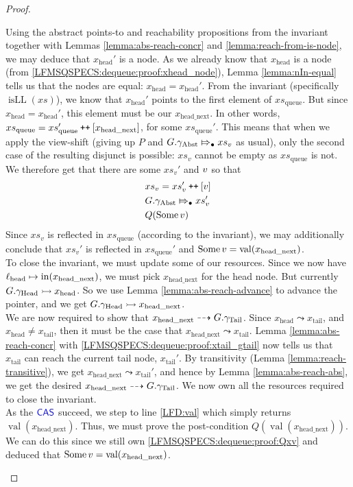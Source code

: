 \documentclass[a4paper, 10pt]{report}
\theoremstyle{definition}
\newcommand{\xsc}{xs}
\newcommand{\xsqueue}{xs_{\mathrm{queue}}}
\newcommand{\isLL}{\operatorname{isLL}}
\newcommand{\locN}[1]{\loc_{\mathrm{#1}}}
\newcommand{\lochead}{\locN{head}}
\newcommand{\nIn}[1]{\operatorname{in}(#1)}
\newcommand{\nVal}[1]{\operatorname{val}(#1)}
\newcommand{\node}{x}
\newcommand{\nodeN}[1]{\node_{\mathrm{#1}}}
\newcommand{\nodehead}{\nodeN{head}}
\newcommand{\nodetail}{\nodeN{tail}}
\newcommand{\nodeheadnext}{\nodeN{head\_next}}
\newcommand{\absvalue}{\val}
\newcommand{\absvalueList}{xs_v}
\newcommand{\Qg}{G}
\newcommand{\gabst}{\gname_{\mathrm{Abst}}}
\newcommand{\ghead}{\gname_{\mathrm{Head}}}
\newcommand{\gtail}{\gname_{\mathrm{Tail}}}
\newcommand\catenate{\mathbin{\text{\ttfamily\upshape ++}}}
\newcommand{\abstractstateauth}[2]{#1 \Mapsto_{\bullet} #2}
\newcommand{\reach}[2]{#1 \leadsto #2}
\newcommand{\ar}[2]{#1 \dashrightarrow #2}
\newcommand{\ap}[2]{#1 \rightarrowtail #2}
\begin{document}
\begin{proof}
\begin{itemize}
\begin{itemize}
      Using the abstract points-to and reachability propositions from the invariant together with Lemmas \ref{lemma:abs-reach-concr} and \ref{lemma:reach-from-is-node}, we may deduce that $\nodehead'$ is a node. As we already know that $\nodehead$ is a node (from \ref{LFMSQSPECS:dequeue:proof:xhead_node}), Lemma \ref{lemma:nIn-equal} tells us that the nodes are equal: $\nodehead = \nodehead'$. From the invariant (specifically $\isLL(\xsc)$), we know that $\nodehead'$ points to the first element of $\xsqueue$. But since $\nodehead = \nodehead'$, this element must be our $\nodeheadnext$. In other words, $\xsqueue = \xsqueue' \catenate [\nodeheadnext]$, for some $\xsqueue'$.
      This means that when we apply the view-shift (giving up $P$ and $\abstractstateauth{\Qg.\gabst}{\absvalueList}$ as usual), only the second case of the resulting disjunct is possible: $\absvalueList$ cannot be empty as $\xsqueue$ is not. We therefore get that there are some $\absvalueList'$ and $\absvalue$ so that
      \begin{align}
        &\absvalueList = \absvalueList' \catenate [\absvalue]\\
        &\abstractstateauth{\Qg.\gabst}{\absvalueList'}\\
        &Q(\Some \absvalue)\label{LFMSQSPECS:dequeue:proof:Qxv}
      \end{align}
      Since $\absvalueList$ is reflected in $\xsqueue$ (according to the invariant), we may additionally conclude that $\absvalueList'$ is reflected in $\xsqueue'$ and $\Some \absvalue = \nVal{\nodeheadnext}$.\\
      To close the invariant, we must update some of our resources. Since we now have $\lochead \mapsto \nIn{\nodeheadnext}$, we must pick $\nodeheadnext$ for the head node. But currently $\ap{\Qg.\ghead}{\nodehead}$. So we use Lemma \ref{lemma:abs-reach-advance} to advance the pointer, and we get $\ap{\Qg.\ghead}{\nodeheadnext}$.\\
      We are now required to show that $\ar{\nodeheadnext}{\Qg.\gtail}$. Since $\reach{\nodehead}{\nodetail}$, and $\nodehead \neq \nodetail$, then it must be the case that $\reach{\nodeheadnext}{\nodetail}$. Lemma \ref{lemma:abs-reach-concr} with \ref{LFMSQSPECS:dequeue:proof:xtail_gtail} now tells us that $\nodetail$ can reach the current tail node, $\nodetail'$. By transitivity (Lemma \ref{lemma:reach-transitive}), we get $\reach{\nodeheadnext}{\nodetail'}$, and hence by Lemma \ref{lemma:abs-reach-abs}, we get the desired $\ar{\nodeheadnext}{\Qg.\gtail}$. We now own all the resources required to close the invariant.\\
      As the $\textsf{\color{blue} CAS}$ succeed, we step to line \ref{LFD:val} which simply returns $\nVal{\nodeheadnext}$. Thus, we must prove the post-condition $Q(\nVal{\nodeheadnext})$. We can do this since we still own \ref{LFMSQSPECS:dequeue:proof:Qxv} and deduced that $\Some \absvalue = \nVal{\nodeheadnext}$.
    \end{itemize}


\end{itemize}
\end{proof}
\end{document}
